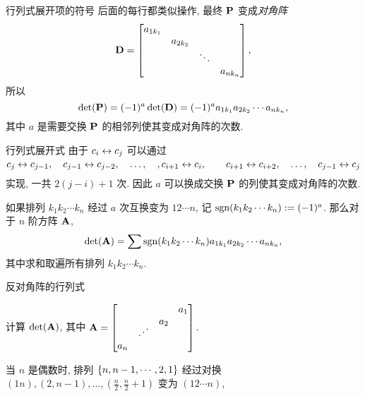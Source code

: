 \begin{frame}{行列式展开项的符号}
	\onslide<+->
	后面的每行都类似操作, 最终 ${\mathbf{P}}$ 变成\emph{对角阵}
	\[{\mathbf{D}}=\begin{bmatrix}
		a_{1k_1}&&&\\
		&a_{2k_2}&&\\
		&&\ddots&\\
		&&&a_{nk_n}
	\end{bmatrix},\]
	\onslide<+->
	所以
	\[\det({\mathbf{P}})=(-1)^a\det({\mathbf{D}})=(-1)^a a_{1k_1}a_{2k_2}\cdots a_{nk_n},\]
	其中 $a$ 是需要交换 ${\mathbf{P}}$ 的相邻列使其变成对角阵的次数.
\end{frame}


\begin{frame}{行列式展开式}
	\onslide<+->
	由于 $c_i\leftrightarrow c_j$ 可以通过
	\[c_j\leftrightarrow c_{j-1},\quad c_{j-1}\leftrightarrow c_{j-2},\quad \dots,\quad, c_{i+1}\leftrightarrow c_i,\qquad
	c_{i+1}\leftrightarrow c_{i+2},\quad \dots,\quad c_{j-1}\leftrightarrow c_j\]
	实现, 一共 $2(j-i)+1$ 次.
	\onslide<+->
	因此 $a$ 可以换成交换 ${\mathbf{P}}$ 的列使其变成对角阵的次数.

	\onslide<+->
	\begin{theorem}
	如果排列 $k_1k_2\cdots k_n$ 经过 $a$ 次互换变为 $12\cdots n$, 记 $\operatorname{sgn}(k_1k_2\cdots k_n):=(-1)^a$.
	那么对于 $n$ 阶方阵 ${\mathbf{A}}$,
		\[\det({\mathbf{A}})=\sum \operatorname{sgn}(k_1k_2\cdots k_n) a_{1k_1}a_{2k_2}\cdots a_{nk_n},\]	
	其中求和取遍所有排列 $k_1k_2\cdots k_n$.
	\end{theorem}
\end{frame}


\begin{frame}{反对角阵的行列式}
	\onslide<+->
	\begin{example}
		计算 $\det({\mathbf{A}})$, 其中 $\bfA=\begin{bmatrix}
			&&&a_1\\&&a_2&\\&\udots&&\\a_n&&&
		\end{bmatrix}$.
	\end{example}
	\onslide<+->
	\begin{solution*}
		当 $n$ 是偶数时, 排列 ${\left\{n,n-1,\cdots,2,1\right\}}$ 经过对换 $(1n),(2,n-1),\dots,(\frac n2,\frac n2+1)$ 变为 $(12\cdots n)$,
		\onslide<+->{因此 $\det(\bfA)=(-1)^{\frac n2}a_1a_2\cdots a_n$.}


		\vspace{-\baselineskip}
	\end{solution*}
\end{frame}

